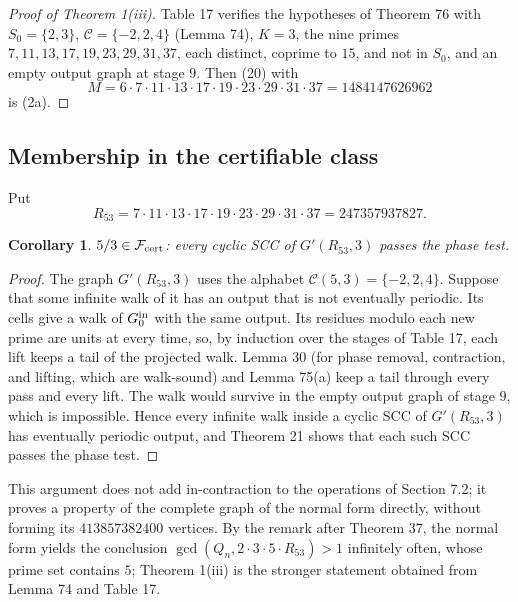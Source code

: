 \documentclass[11pt,reqno]{amsart}
\newtheorem{corollary}[theorem]{Corollary}
\theoremstyle{definition}
\theoremstyle{remark}
\begin{document}
\begin{proof}[Proof of Theorem 1(iii)]\leavevmode\label{proof:1-iii}
Table 17 verifies the hypotheses of Theorem 76 with \(S_0=\{2,3\}\),
\(\mathcal C=\{-2,2,4\}\) (Lemma 74), \(K=3\), the nine primes
\(7,11,13,17,19,23,29,31,37\), each distinct, coprime to \(15\), and not
in \(S_0\), and an empty output graph at stage \(9\). Then (20) with
\[
M=6\cdot7\cdot11\cdot13\cdot17\cdot19\cdot23\cdot29\cdot31\cdot37
=1484147626962
\]
is (2a). \qedhere
\end{proof}

\subsection{Membership in the certifiable class}\label{sec:F.4}

Put
\[
R_{53}=7\cdot11\cdot13\cdot17\cdot19\cdot23\cdot29\cdot31\cdot37
=247357937827.
\]

\begin{samepage}
\begin{corollary}\leavevmode\label{thm:77}
\(5/3\in\mathcal F_{\rm cert}\): every cyclic SCC of
\(G'(R_{53},3)\) passes the phase test.
\label{thm-end:77}
\end{corollary}
\end{samepage}

\begin{proof}\leavevmode\label{proof:77}
The graph \(G'(R_{53},3)\) uses the alphabet
\(\mathcal C(5,3)=\{-2,2,4\}\). Suppose that some infinite walk of it has
an output that is not eventually periodic. Its cells give a walk of
\(G_0^{\rm in}\) with the same output. Its residues modulo each new prime
are units at every time, so, by induction over the stages of Table 17,
each lift keeps a tail of the projected walk. Lemma 30 (for phase removal,
contraction, and lifting, which are walk-sound) and Lemma 75(a) keep a
tail through every pass and every lift. The walk
would survive in the empty output graph of stage \(9\), which is
impossible. Hence every infinite walk inside a cyclic SCC of
\(G'(R_{53},3)\) has eventually periodic output, and Theorem 21 shows
that each such SCC passes the phase test. \qedhere
\end{proof}

This argument does not add in-contraction to the operations of
Section 7.2; it proves a property of the complete graph of the normal
form directly, without forming its \(413857382400\) vertices. By the
remark after Theorem 37, the normal form yields the conclusion
\(\gcd(Q_n,2\cdot3\cdot5\cdot R_{53})>1\) infinitely often, whose prime
set contains \(5\); Theorem 1(iii) is the stronger statement obtained
from Lemma 74 and Table 17.
\end{document}
